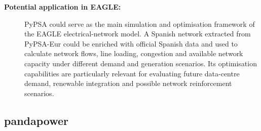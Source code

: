 \begin{description}
    \item[\textbf{Potential application in EAGLE:}]
    PyPSA could serve as the main simulation and optimisation framework of
    the EAGLE electrical-network model. A Spanish network extracted from
    PyPSA-Eur could be enriched with official Spanish data and used to
    calculate network flows, line loading, congestion and available network
    capacity under different demand and generation scenarios. Its
    optimisation capabilities are particularly relevant for evaluating
    future data-centre demand, renewable integration and possible network
    reinforcement scenarios.

\end{description}



\subsection{pandapower}


